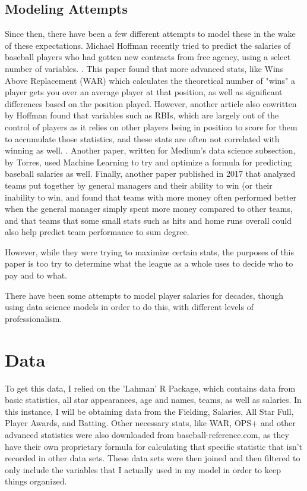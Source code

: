 \documentclass{article}
\begin{document}
\subsection{Modeling Attempts}
Since then, there have been a few different attempts to model these in the wake of these expectations. Michael Hoffman recently tried to predict the salaries of baseball players who had gotten new contracts from free agency, using a select number of variables. \citet{hoffman2014graduate}. This paper found that more advanced stats, like Wins Above Replacement (WAR) which calculates the theoretical number of "wins" a player gets you over an average player at that position, as well as significant differences based on the position played. However, another article also cowritten by Hoffman found that variables such as RBIs, which are largely out of the control of players as it relies on other players being in position to score for them to accumulate those statistics, and these stats are often not correlated with winning as well. \citet{Magel2015salaries}. Another paper, written for Medium's data science subsection, by Torres, used Machine Learning to try and optimize a formula for predicting baseball salaries as well. \citet{torres2020mlbaseball} Finally, another paper published in 2017 that analyzed teams put together by general managers and their ability to win (or their inability to win, and found that teams with more money often performed better when the general manager simply spent more money compared to other teams, and that teams that some small stats such as hits and home runs overall could also help predict team performance to sum degree. \citet{}



However, while they were trying to maximize certain stats, the purposes of this paper is too try to determine what the league as a whole uses to decide who to pay and to what. 

There have been some attempts to model player salaries for decades, though using data science models in order to do this, with different levels of professionalism. 

\section{Data}

To get this data, I relied on the 'Lahman' R Package, which contains data from basic statistics, all star appearances, age and names, teams, as well as salaries. In this instance, I will be obtaining data from the Fielding, Salaries, All Star Full, Player Awards, and Batting. Other necessary stats, like WAR, OPS+ and other advanced statistics were also downloaded from baseball-reference.com, as they have their own proprietary formula for calculating that specific statistic that isn't recorded in other data sets. These data sets were then joined and then filtered to only include the variables that I actually used in my model in order to keep things organized. 
\end{document}
